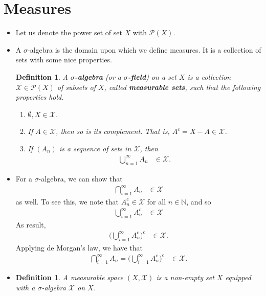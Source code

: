 \documentclass[10pt]{article}
\newtheorem{definition}[lemma]{Definition}
\newcommand{\mcal}[1]{\mathcal{#1}}
\begin{document}
\section{Measures}

\begin{itemize}
  \item Let us denote the power set of set $X$ with $\mcal{P}(X)$.
  
  \item A $\sigma$-algebra is the domain upon which we define measures. It is a collection of sets with some nice properties.
  
  \begin{definition}    
    A {\bf $\sigma$-algebra} (or a {\bf $\sigma$-field}) on a set $X$ is a collection $\mcal{X} \in \mcal{P}(X)$ of subsets of $X$, called {\bf measurable sets}, such that the following properties hold.
    \begin{enumerate}
      \item $\emptyset, X \in \mcal{X}$.
      \item If $A \in \mcal{X}$, then so is its complement. That is, $A^c = X - A \in \mcal{X}$.
      \item If $(A_n)$ is a sequence of sets in $\mcal{X}$, then
      \begin{align*}
        \bigcup_{n=1}^\infty A_n &\in \mcal{X}.        
      \end{align*}
    \end{enumerate}
  \end{definition}

  \item For a $\sigma$-algebra, we can show that
  \begin{align*}
    \bigcap_{i=1}^\infty A_n &\in \mcal{X}
  \end{align*}
  as well. To see this, we note that $A_n^c \in \mcal{X}$ for all $n \in \mathbb{N}$, and so
  \begin{align*}
    \bigcup_{i=1}^\infty A_n^c &\in \mcal{X}
  \end{align*}
  As result,
  \begin{align*}
    \bigg( \bigcup_{i=1}^\infty A_n^c \bigg)^c &\in \mcal{X}.
  \end{align*}
  Applying de Morgan's law, we have that
  \begin{align*}
    \bigcap_{i=1}^\infty A_n = \bigg( \bigcup_{i=1}^\infty A_n^c \bigg)^c  &\in \mcal{X}.
  \end{align*}

  \item \begin{definition}
    A measurable space $(X, \mcal{X})$ is a non-empty set $X$ equipped with a $\sigma$-algebra $\mcal{X}$ on $X$.
  \end{definition}


\end{itemize}
\end{document}

